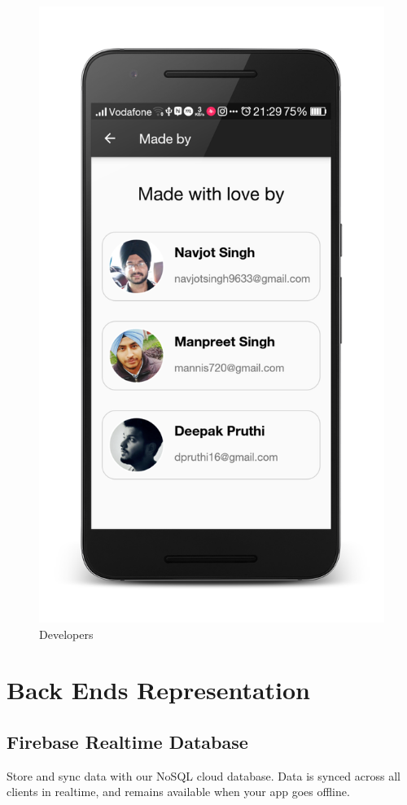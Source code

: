 \newpage
\begin{figure}[ht]
\centering
\includegraphics[scale=0.13]{images/d2.png}
\caption{Developers}
\end{figure}

\newpage

\section{Back Ends Representation}
\subsection{Firebase Realtime Database}
Store and sync data with our NoSQL cloud database. Data is synced across all clients in realtime, and remains available when your app goes offline.\\

